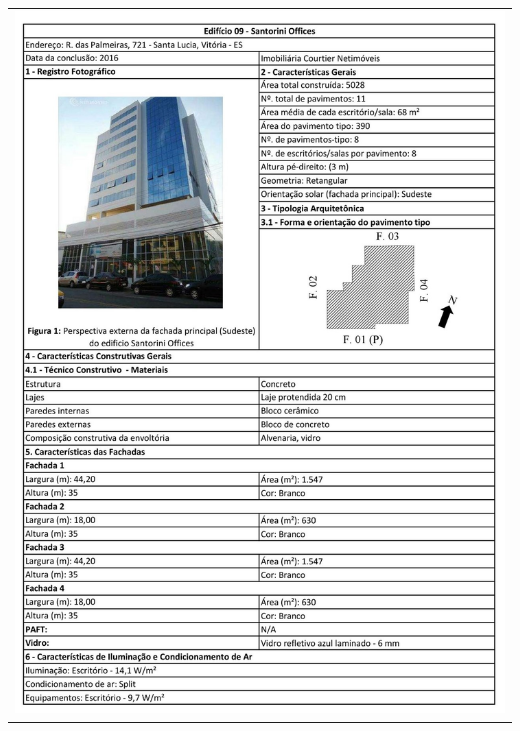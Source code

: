 \begin{table}[H]
    \centering
    \begin{tabular}{l}
        \includegraphics[width=\textwidth]{figures/appendices/edificio09.jpg}
    \end{tabular}
\end{table}
\pagebreak
